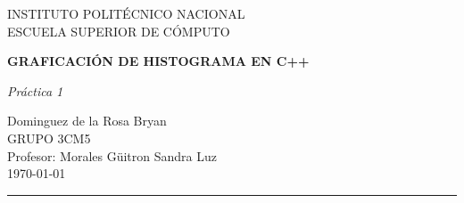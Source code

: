 \begin{titlepage}
\begin{center}
\begin{LARGE}
INSTITUTO POLITÉCNICO NACIONAL\\
\vspace*{0.15in}
ESCUELA SUPERIOR DE CÓMPUTO\\
\end{LARGE}
\vspace*{1.0in}
\begin{Large}
\textbf{GRAFICACIÓN DE HISTOGRAMA EN C++} \\  
\end{Large}
\vspace*{0.2in}
\begin{large}
\textit{Práctica 1}\\
\end{large}
\vspace*{1.0in}
\begin{large}
Dominguez de la Rosa Bryan\\
\vspace*{2.0in}
GRUPO 3CM5\\
\vspace*{0.2in}
Profesor: Morales Güitron Sandra Luz\\
\vspace*{1.5in}
\today
\vspace*{0.3in}
\end{large}
\rule{150mm}{0.1mm}\\

\end{center}
\end{titlepage}
